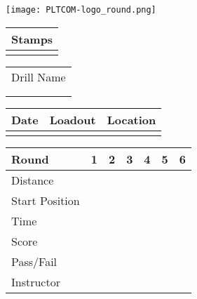 \documentclass[../Cover.tex]{subfiles}
\begin{document}
\begin{minipage}[t]{0.15\textwidth} 
	\texttt{[image: PLTCOM-logo\_round.png]}
	\begin{tabular}{p{}|}
		Stamps \\
		\hline
		\\[5.5cm]
	\end{tabular}
\end{minipage}
\hfill
\begin{minipage}[t]{0.85\textwidth}

	\begin{minipage}[t]{3cm}
		\begin{tabular}{ p{3cm} }			
			\large Drill Name\\[0.5cm]
			\\
			\hline
			\\	
		\end{tabular}
	\end{minipage}
	\hfill
	\begin{minipage}[t]{0.3\textwidth}
		\begin{tabular}{ | p{1.5cm} | p{1.5cm} | p{1.5cm} |}
			\hline
			Date & Loadout & Location\\ 
			\hline
			&  &  \\ 
			\hline
		\end{tabular}
	\end{minipage}
	\begin{tabular}{ | p{1.5cm} | p{1cm} | p{.5cm} | p{.5cm} | p{.5cm} | p{.5cm} | p{.5cm} |}
		\hline
		Round & 1 & 2 & 3 & 4 & 5 & 6 \\ 
		\hline
		\tiny Distance & & & & & & \\ 		
		\hline
		\tiny Start Position & & & & & & \\
		\hline
		\tiny Time & & & & & & \\
		\hline
		\tiny Score & & & & & & \\
		\hline
		\tiny Pass/Fail & & & & & & \\
		\hline
		\tiny Instructor & & & & & & \\
		\hline
	\end{tabular}
\end{minipage}
\end{document}

